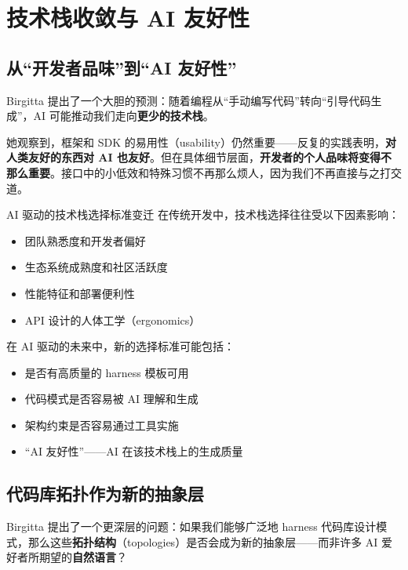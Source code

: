 \section{技术栈收敛与 AI 友好性}

\subsection{从``开发者品味''到``AI 友好性''}

Birgitta 提出了一个大胆的预测：随着编程从``手动编写代码''转向``引导代码生成''，AI 可能推动我们走向\textbf{更少的技术栈}。

她观察到，框架和 SDK 的易用性（usability）仍然重要------反复的实践表明，\textbf{对人类友好的东西对 AI 也友好}。但在具体细节层面，\textbf{开发者的个人品味将变得不那么重要}。接口中的小低效和特殊习惯不再那么烦人，因为我们不再直接与之打交道。

\begin{knowledgebox}{AI 驱动的技术栈选择标准变迁}
在传统开发中，技术栈选择往往受以下因素影响：
\begin{itemize}[leftmargin=1.5em]
    \item 团队熟悉度和开发者偏好
    \item 生态系统成熟度和社区活跃度
    \item 性能特征和部署便利性
    \item API 设计的人体工学（ergonomics）
\end{itemize}

在 AI 驱动的未来中，新的选择标准可能包括：
\begin{itemize}[leftmargin=1.5em]
    \item 是否有高质量的 harness 模板可用
    \item 代码模式是否容易被 AI 理解和生成
    \item 架构约束是否容易通过工具实施
    \item ``AI 友好性''------AI 在该技术栈上的生成质量
\end{itemize}
\end{knowledgebox}

\subsection{代码库拓扑作为新的抽象层}

Birgitta 提出了一个更深层的问题：如果我们能够广泛地 harness 代码库设计模式，那么这些\textbf{拓扑结构}（topologies）是否会成为新的抽象层------而非许多 AI 爱好者所期望的\textbf{自然语言}？

